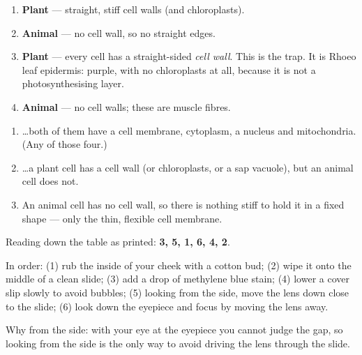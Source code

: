\documentclass[12pt,a4paper]{article}
\begin{document}
\begin{enumerate}[label=\arabic*., itemsep=2pt]
  \item \textbf{Plant} --- straight, stiff cell walls (and chloroplasts).
  \item \textbf{Animal} --- no cell wall, so no straight edges.
  \item \textbf{Plant} --- every cell has a straight-sided \emph{cell wall}. This is
        the trap. It is Rhoeo leaf epidermis: purple, with no chloroplasts at all,
        because it is not a photosynthesising layer.
  \item \textbf{Animal} --- no cell walls; these are muscle fibres.
\end{enumerate}

\begin{enumerate}[label=\arabic*., itemsep=2pt]
  \item \ldots both of them have a cell membrane, cytoplasm, a nucleus and
        mitochondria. (Any of those four.)
  \item \ldots a plant cell has a cell wall (or chloroplasts, or a sap vacuole), but
        an animal cell does not.
  \item An animal cell has no cell wall, so there is nothing stiff to hold it in a
        fixed shape --- only the thin, flexible cell membrane.
\end{enumerate}

\noindent Reading down the table as printed: \textbf{3, 5, 1, 6, 4, 2}.

\smallskip
\noindent In order: (1) rub the inside of your cheek with a cotton bud; (2) wipe it
onto the middle of a clean slide; (3) add a drop of methylene blue stain; (4) lower a
cover slip slowly to avoid bubbles; (5) looking from the side, move the lens down
close to the slide; (6) look down the eyepiece and focus by moving the lens away.

\smallskip
\noindent Why from the side: with your eye at the eyepiece you cannot judge the gap,
so looking from the side is the only way to avoid driving the lens through the slide.
\end{document}
